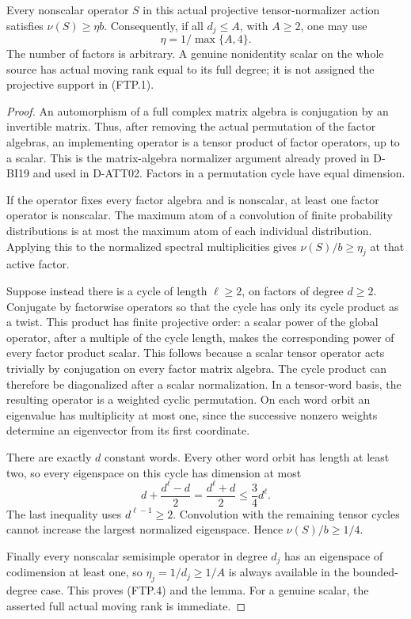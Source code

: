\begin{lemma}[HD-FT18]
Every nonscalar operator \(S\) in this actual projective
tensor-normalizer action satisfies \(\nu(S)\ge\eta b\).
Consequently, if all \(d_j\le A\), with \(A\ge2\), one may use
\[
                         \eta=1/\max\{A,4\}.
 \tag{FTP.4}
\]
The number of factors is arbitrary.  A genuine nonidentity scalar
on the whole source has actual moving rank equal to its full degree;
it is not assigned the projective support in (FTP.1).
\end{lemma}

\begin{proof}
An automorphism of a full complex matrix algebra is conjugation by
an invertible matrix.  Thus, after removing the actual permutation
of the factor algebras, an implementing operator is a tensor product
of factor operators, up to a scalar.  This is the matrix-algebra
normalizer argument already proved in D-BI19 and used in D-ATT02.
Factors in a permutation cycle have equal dimension.

If the operator fixes every factor algebra and is nonscalar, at
least one factor operator is nonscalar.  The maximum atom of a
convolution of finite probability distributions is at most the
maximum atom of each individual distribution.  Applying this to
the normalized spectral multiplicities gives
\(\nu(S)/b\ge\eta_j\) at that active factor.

Suppose instead there is a cycle of length \(\ell\ge2\), on
factors of degree \(d\ge2\).  Conjugate by factorwise operators so
that the cycle has only its cycle product as a twist.  This product
has finite projective order: a scalar power of the global operator,
after a multiple of the cycle length, makes the corresponding power
of every factor product scalar.  This follows because a scalar tensor
operator acts trivially by conjugation on every factor matrix algebra.
The cycle product can therefore be diagonalized after a scalar
normalization.  In a tensor-word basis, the resulting operator is
a weighted cyclic permutation.  On each word orbit an eigenvalue
has multiplicity at most one, since the successive nonzero weights
determine an eigenvector from its first coordinate.

There are exactly \(d\) constant words.  Every other word orbit
has length at least two, so every eigenspace on this cycle has
dimension at most
\[
 d+\frac{d^\ell-d}{2}
       =\frac{d^\ell+d}{2}\le\frac34d^\ell.
 \tag{FTP.5}
\]
The last inequality uses \(d^{\ell-1}\ge2\).  Convolution with
the remaining tensor cycles cannot increase the largest normalized
eigenspace.  Hence \(\nu(S)/b\ge1/4\).

Finally every nonscalar semisimple operator in degree \(d_j\)
has an eigenspace of codimension at least one, so
\(\eta_j=1/d_j\ge1/A\) is always available in the bounded-degree
case.  This proves (FTP.4) and the lemma.  For a genuine scalar,
the asserted full actual moving rank is immediate.
\end{proof}

